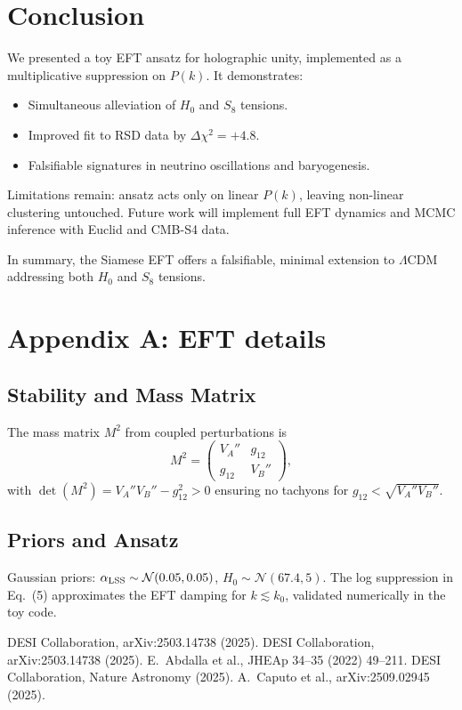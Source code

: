 \documentclass[11pt,a4paper]{article}
\begin{document}
\section{Conclusion}
We presented a toy EFT ansatz for holographic unity, implemented as a multiplicative suppression on $P(k)$. It demonstrates:
\begin{itemize}
    \item Simultaneous alleviation of $H_0$ and $S_8$ tensions.
    \item Improved fit to RSD data by $\Delta\chi^2=+4.8$.
    \item Falsifiable signatures in neutrino oscillations and baryogenesis.
\end{itemize}

Limitations remain: ansatz acts only on linear $P(k)$, leaving non-linear clustering untouched. Future work will implement full EFT dynamics and MCMC inference with Euclid and CMB-S4 data.

In summary, the Siamese EFT offers a falsifiable, minimal extension to $\Lambda$CDM addressing both $H_0$ and $S_8$ tensions.

\appendix
\section*{Appendix A: EFT details}
\subsection{Stability and Mass Matrix}
The mass matrix $M^2$ from coupled perturbations is
\begin{equation}
M^2 = \begin{pmatrix}
V_A'' & g_{12} \\
g_{12} & V_B''
\end{pmatrix},
\end{equation}
with $\det(M^2) = V_A'' V_B'' - g_{12}^2 > 0$ ensuring no tachyons for $g_{12} < \sqrt{V_A'' V_B''}$.

\subsection{Priors and Ansatz}
Gaussian priors: $\alpha_{\rm LSS} \sim \mathcal{N}(0.05, 0.05)$, $H_0 \sim \mathcal{N}(67.4, 5)$. The log suppression in Eq.~(5) approximates the EFT damping for $k \lesssim k_0$, validated numerically in the toy code.

\begin{thebibliography}{99}\setlength{\itemsep}{2pt}
 DESI Collaboration, arXiv:2503.14738 (2025).
 DESI Collaboration, arXiv:2503.14738 (2025).
 E.~Abdalla et al., JHEAp 34--35 (2022) 49--211.
 DESI Collaboration, Nature Astronomy (2025).
 A.~Caputo et al., arXiv:2509.02945 (2025).
\end{thebibliography}
\end{document}
